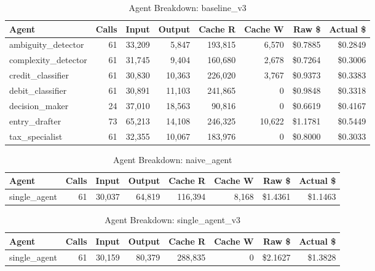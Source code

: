 \begin{table}[htbp]
\centering
\caption{Agent Breakdown: baseline\_v3}
\label{tab:agent-baseline-v3}
\begin{tabular}{l r rr rr rr}
\toprule
Agent & Calls & Input & Output & Cache R & Cache W & Raw \$ & Actual \$ \\
\midrule
  ambiguity\_detector & 61 & 33,209 & 5,847 & 193,815 & 6,570 & \$0.7885 & \$0.2849 \\
  complexity\_detector & 61 & 31,745 & 9,404 & 160,680 & 2,678 & \$0.7264 & \$0.3006 \\
  credit\_classifier & 61 & 30,830 & 10,363 & 226,020 & 3,767 & \$0.9373 & \$0.3383 \\
  debit\_classifier & 61 & 30,891 & 11,103 & 241,865 & 0 & \$0.9848 & \$0.3318 \\
  decision\_maker & 24 & 37,010 & 18,563 & 90,816 & 0 & \$0.6619 & \$0.4167 \\
  entry\_drafter & 73 & 65,213 & 14,108 & 246,325 & 10,622 & \$1.1781 & \$0.5449 \\
  tax\_specialist & 61 & 32,355 & 10,067 & 183,976 & 0 & \$0.8000 & \$0.3033 \\
\bottomrule
\end{tabular}
\end{table}

\begin{table}[htbp]
\centering
\caption{Agent Breakdown: naive\_agent}
\label{tab:agent-naive-agent}
\begin{tabular}{l r rr rr rr}
\toprule
Agent & Calls & Input & Output & Cache R & Cache W & Raw \$ & Actual \$ \\
\midrule
  single\_agent & 61 & 30,037 & 64,819 & 116,394 & 8,168 & \$1.4361 & \$1.1463 \\
\bottomrule
\end{tabular}
\end{table}

\begin{table}[htbp]
\centering
\caption{Agent Breakdown: single\_agent\_v3}
\label{tab:agent-single-agent-v3}
\begin{tabular}{l r rr rr rr}
\toprule
Agent & Calls & Input & Output & Cache R & Cache W & Raw \$ & Actual \$ \\
\midrule
  single\_agent & 61 & 30,159 & 80,379 & 288,835 & 0 & \$2.1627 & \$1.3828 \\
\bottomrule
\end{tabular}
\end{table}

